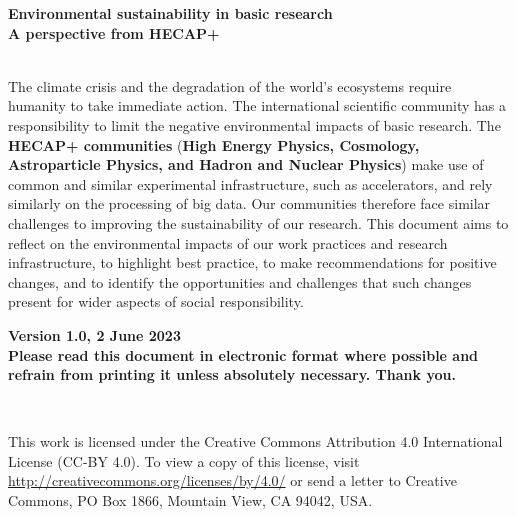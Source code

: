 \documentclass[../SustainableHEP.tex]{subfiles}
\begin{document}
\RaggedRight
\sloppy
\begin{titlepage}

    \doublespacing    
    \begin{flushleft}
    \textbf{\huge Environmental sustainability in basic research}\\
    \textbf{\Large A perspective from HECAP+}
    \end{flushleft}
    \singlespacing

    \vspace{27em}

    \\

    \noindent The climate crisis and the degradation of the world's ecosystems require humanity to take immediate action. The international scientific community has a responsibility to limit the negative environmental impacts of basic research. The \textbf{HECAP+ communities} (\textbf{High Energy Physics, Cosmology, Astroparticle Physics, and Hadron and Nuclear Physics}) make use of common and similar experimental infrastructure, such as accelerators, and rely similarly on the processing of big data. Our communities therefore face similar challenges to improving the sustainability of our research. This document aims to reflect on the environmental impacts of our work practices and research infrastructure, to highlight best practice, to make recommendations for positive changes, and to identify the opportunities and challenges that such changes present for wider aspects of social responsibility.\\
           
    \begin{flushright}
        \textbf{Version 1.0, 2 June 2023}\\
        \textbf{\textcolor{Pythongreen}{Please read this document in electronic format where possible and refrain from printing it unless absolutely necessary. Thank you.}}
    \end{flushright}

\end{titlepage}

\newpage

\thispagestyle{empty}

~

\vspace{18em}
\RaggedRight

\noindent This work is licensed under the Creative Commons Attribution 4.0 International License (CC-BY 4.0). To view a copy of this license, visit \url{http://creativecommons.org/licenses/by/4.0/} or send a letter to Creative Commons, PO Box 1866, Mountain View, CA 94042, USA.
\end{document}
